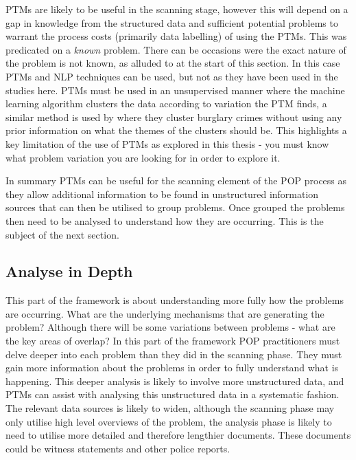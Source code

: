 PTMs are likely to be useful in the scanning stage, however this will depend on a gap in knowledge from the structured data and sufficient potential problems to warrant the process costs (primarily data labelling) of using the PTMs.  This was predicated on a \emph{known} problem. There can be occasions were the exact nature of the problem is not known, as alluded to at the start of this section. In this case PTMs and NLP techniques can be used, but not as they have been used in the studies here. PTMs must be used in an unsupervised manner where the machine learning algorithm clusters the data according to variation the PTM finds, a similar method is used by \textcite{birks2020unsupervised} where they cluster burglary crimes without using any prior information on what the themes of the clusters should be. This highlights a key limitation of the use of PTMs as explored in this thesis - you must know what problem variation you are looking for in order to explore it.

In summary PTMs can be useful for the scanning element of the POP process as they allow additional information to be found in unstructured information sources that can then be utilised to group problems. Once grouped the problems then need to be analysed to understand how they are occurring. This is the subject of the next section. 


\subsection{Analyse in Depth} This part of the framework is about understanding more fully how the problems are occurring. What are the underlying mechanisms that are generating the problem? Although there will be some variations between problems - what are the key areas of overlap? In this part of the framework POP practitioners must delve deeper into each problem than they did in the scanning phase. They must gain more information about the problems in order to fully understand what is happening. This deeper analysis is likely to involve more unstructured data, and PTMs can assist with analysing this unstructured data in a systematic fashion. The relevant data sources is likely to widen, although the scanning phase may only utilise high level overviews of the problem, the analysis phase is likely to need to utilise more detailed and therefore lengthier documents. These documents could be witness statements and other police reports.

